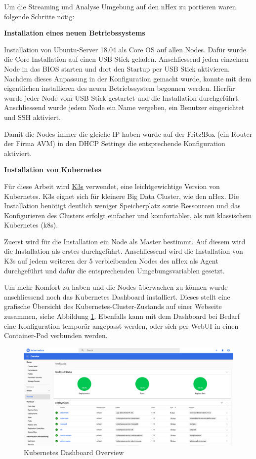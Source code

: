 Um die Streaming und Analyse Umgebung auf den nHex zu portieren waren folgende Schritte n{\"o}tig:

\textbf{Installation eines neuen Betriebssystems}

Installation  von Ubuntu-Server 18.04 als Core OS auf allen Nodes. Daf{\"u}r wurde die Core Installation auf einen USB Stick geladen. Anschliessend jeden einzelnen Node in das BIOS starten und dort den Startup per USB Stick aktivieren. Nachdem dieses Anpassung in der Konfiguration gemacht wurde, konnte mit dem eigentlichen installieren des neuen Betriebssystem begonnen werden. Hierf{\"u}r wurde jeder Node vom USB Stick gestartet und die Installation durchgef{\"u}hrt. Anschliessend wurde jedem Node ein Name vergeben, ein Benutzer eingerichtet und SSH aktiviert.

Damit die Nodes immer die gleiche IP haben wurde auf der Fritz!Box (ein Router der Firma AVM) in den DHCP Settings die entsprechende Konfiguration aktiviert.

\textbf{Installation von Kubernetes}

F{\"u}r diese Arbeit wird \href{https://k3s.io}{K3s} verwendet, eine leichtgewichtige Version von Kubernetes. K3s eignet sich f{\"u}r kleinere Big Data Cluster, wie den nHex. Die Installation ben{\"o}tigt deutlich weniger Speicherplatz sowie Ressourcen und das Konfigurieren des Clusters erfolgt einfacher und komfortabler, als mit klassischem Kubernetes (k8s).

Zuerst wird f{\"u}r die Installation ein Node als Master bestimmt. Auf diesem wird die Installation als erstes durchgef{\"u}hrt. Anschliessend wird die Installation von K3s auf jedem weiteren der 5 verbleibenden Nodes des nHex als Agent durchgef{\"u}hrt und daf{\"u}r die entsprechenden Umgebungsvariablen gesetzt. 

Um mehr Komfort zu haben und die Nodes {\"u}berwachen zu k{\"o}nnen wurde anschliessend noch das Kubernetes Dashboard installiert. Dieses stellt eine grafische {\"U}bersicht des Kubernetes-Cluster-Zustands auf einer Webseite zusammen, siehe Abbildung \ref{fig:kubernetes_overview}. Ebenfalls kann mit dem Dashboard bei Bedarf eine Konfiguration tempor{\"a}r angepasst werden, oder sich per WebUI in einen Container-Pod verbunden werden.

\begin{figure}[H]
	\centering
		\includegraphics[scale=0.2]{images/kubernetes_overview.png}
	\caption{Kubernetes Dashboard Overview}
	\label{fig:kubernetes_overview}
\end{figure}
 
